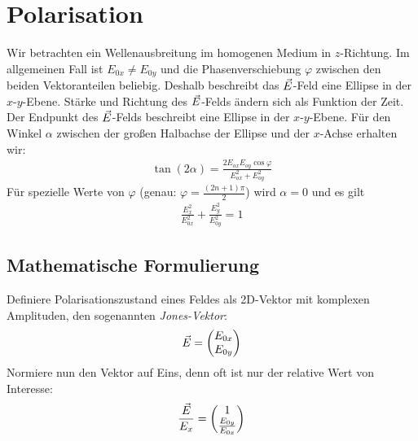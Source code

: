 
\chapter{Polarisation}

Wir betrachten ein Wellenausbreitung im homogenen Medium in
$z$-Richtung.
Im allgemeinen Fall ist $E_{0x}\neq E_{0y}$ und die Phasenverschiebung
$\varphi$ zwischen den beiden Vektoranteilen beliebig.
Deshalb beschreibt das $\vec{E}$-Feld eine Ellipse in der
$x$-$y$-Ebene. Stärke und Richtung des $\vec{E}$-Felds ändern sich als
Funktion der Zeit. Der Endpunkt des $\vec{E}$-Felds beschreibt eine
Ellipse in der $x$-$y$-Ebene. Für den Winkel $\alpha$ zwischen der
großen Halbachse der Ellipse und der $x$-Achse erhalten wir:
\begin{gather*}
  \tan(2\alpha) 
  = \frac{2E_{ox}E_{oy}\cos\varphi}{E_{ox}^2 + E_{oy}^2}
\end{gather*}
Für spezielle Werte von $\varphi$ (genau:
$\varphi=\frac{(2n+1)\pi}{2}$) wird $\alpha = 0$ und es gilt 
\begin{gather*}
  \frac{E_x^2}{E_{0x}^2} + \frac{E_y^2}{E_{0y}^2} = 1
\end{gather*}

\section{Mathematische Formulierung}
Definiere Polarisationszustand eines Feldes als 2D-Vektor mit
komplexen Amplituden, den sogenannten
\emph{Jones-Vektor}:
\begin{gather*}
  \vec{E} = \begin{pmatrix}E_{0x}\\E_{0y}\end{pmatrix}
\end{gather*}
Normiere nun den Vektor auf Eins, denn oft ist nur der relative Wert
von Interesse:
\begin{gather*}
  \frac{\vec{E}}{E_x} 
  = \begin{pmatrix}
    1\\\frac{E_{0y}}{E_{0x}}
  \end{pmatrix}
\end{gather*}

